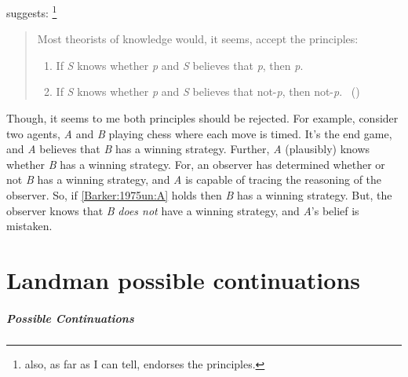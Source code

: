 \begin{note}
  \citeauthor{Barker:1975un} suggests:%
  \footnote{
    \citeauthor{Barker:1975un} also, as far as I can tell, endorses the principles.
  }

  \begin{quote}
    Most theorists of knowledge would, it seems, accept the principles:
    \begin{enumerate}[label=(\Alph*), ref=(\Alph*)]
    \item
      \label{Barker:1975un:A}
      If \emph{S} knows whether \emph{p} and \emph{S} believes that \emph{p}, then \emph{p}.
    \item
      \label{Barker:1975un:B}
      If \emph{S} knows whether \emph{p} and \emph{S} believes that not-\emph{p}, then not-\emph{p}.\newline
      \mbox{ }\hfill\mbox{(\citeyear[281]{Barker:1975un})}
    \end{enumerate}
  \end{quote}
  Though, it seems to me both principles should be rejected.
  For example, consider two agents, \emph{A} and \emph{B} playing chess where each move is timed.
  It's the end game, and \emph{A} believes that \emph{B} has a winning strategy.
  Further, \emph{A} (plausibly) knows whether \emph{B} has a winning strategy.
  For, an observer has determined whether or not \emph{B} has a winning strategy, and \emph{A} is capable of tracing the reasoning of the observer.
  So, if \ref{Barker:1975un:A} holds then \emph{B} has a winning strategy.
  But, the observer knows that \emph{B} \emph{does not} have a winning strategy, and \emph{A}'s belief is mistaken.
\end{note}

\section{Landman possible continuations}
\label{sec:landm-poss-cont}

\subparagraph{Possible Continuations}

